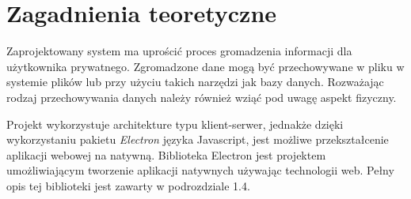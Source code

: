 \documentclass[12pt,a4paper,twoside]{article}
\begin{document}
\section{Zagadnienia teoretyczne}
Zaprojektowany system ma uprościć proces gromadzenia informacji dla użytkownika prywatnego. Zgromadzone dane mogą być przechowywane w pliku w systemie plików lub przy użyciu takich narzędzi jak bazy danych. Rozważając rodzaj przechowywania danych należy również wziąć pod uwagę aspekt fizyczny.  \par
Projekt wykorzystuje architekture typu klient-serwer, jednakże dzięki wykorzystaniu pakietu \textit{Electron} języka Javascript, jest możliwe przekształcenie aplikacji webowej na natywną. Biblioteka Electron jest projektem umożliwiającym tworzenie aplikacji natywnych używając technologii web. Pełny opis tej biblioteki jest zawarty w podrozdziale 1.4. 
\end{document}
